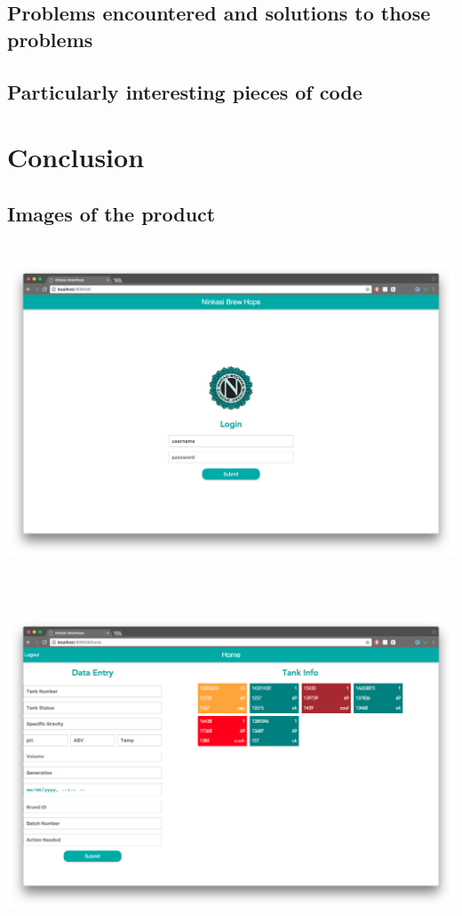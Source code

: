 \documentclass[draftclsnofoot,onecolumn,letterpaper,10pt,compsoc]{IEEEtran}
\begin{document}
\subsection{Problems encountered and solutions to those problems}
\subsection{Particularly interesting pieces of code}

\section{Conclusion}

\subsection{Images of the product}
\centerline{\includegraphics[height=10cm]{screenshots/desktop/login.png}}
\centerline{\includegraphics[height=10cm]{screenshots/desktop/home.png}}
\end{document}
